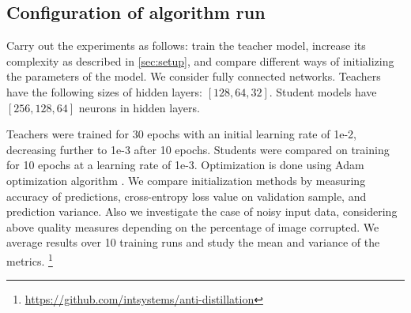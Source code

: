 \documentclass[conference]{IEEEtran}
\begin{document}
\subsection{Configuration of algorithm run}

Carry out the experiments as follows: train the teacher model, increase its complexity as described in \ref{sec:setup}, and compare different ways of initializing the parameters of the model. We consider fully connected networks. Teachers have the following sizes of hidden layers: $[128, 64, 32]$. Student models have $[256, 128, 64]$ neurons in hidden layers.

Teachers were trained for 30 epochs with an initial learning rate of 1e-2, decreasing further to 1e-3 after 10 epochs. Students were compared on training for 10 epochs at a learning rate of 1e-3. Optimization is done using Adam optimization algorithm \cite{adam}. We compare initialization methods by measuring accuracy of predictions, cross-entropy loss value on validation sample, and prediction variance. Also we investigate the case of noisy input data, considering above quality measures depending on the percentage of image corrupted. We average results over 10 training runs and study the mean and variance of the metrics. \footnote{\url{https://github.com/intsystems/anti-distillation}}
\end{document}
